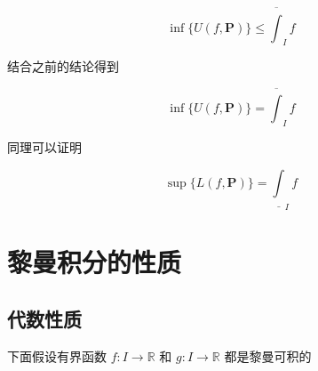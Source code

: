 \[
 \inf \{ U(f, \mathbf{P}) \}   \le  \overline{\int}_I f
\]

结合之前的结论得到

\[
 \inf \{ U(f, \mathbf{P}) \}  =  \overline{\int}_I f
\]

同理可以证明


\[
 \sup \{ L(f, \mathbf{P}) \}  =  \underline{\int}_I f
\]

\section{黎曼积分的性质}

\subsection{代数性质}

下面假设有界函数 $f: I \to \mathbb{R}$ 和 $g: I \to \mathbb{R}$ 都是黎曼可积的

